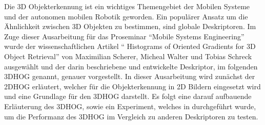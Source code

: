 Die 3D Objekterkennung ist ein wichtiges Themengebiet der Mobilen Systeme und der autonomen mobilen Robotik geworden.
Ein populärer Ansatz um die Ähnlichkeit zwischen 3D Objekten zu bestimmen, sind globale Deskriptoren. Im Zuge
dieser Ausarbeitung für das Proseminar "`Mobile Systems Engineering"' wurde der wissenschaftlichen Artikel 
"` Histograms of Oriented Gradients for 3D Object Retrieval"' von  Maximilian Scherer, Micheal Walter und Tobias Schreck 
ausgewählt und der darin beschriebene und entwickelte Deskriptor, im folgenden 3DHOG genannt, genauer vorgestellt.
In dieser Ausarbeitung wird zunächst der 2DHOG erläutert, welcher für die Objekterkennung in 2D Bildern eingesetzt wird und eine Grundlage
für den 3DHOG darstellt. Es folgt eine darauf aufbauende Erläuterung des 3DHOG, sowie ein Experiment, welches in \cite{scherer2010histograms}
durchgeführt wurde, um die Performanz des 3DHOG im Vergleich zu anderen Deskriptoren zu testen.
